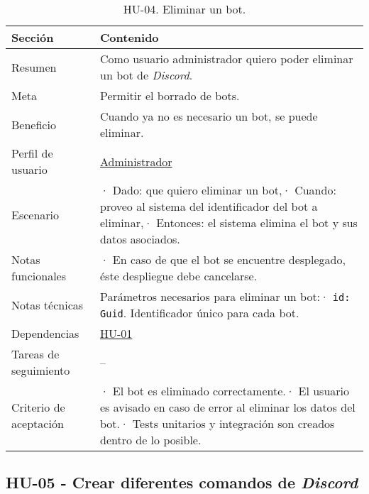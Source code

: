 \begin{table}[H]
    \centering
    \def\arraystretch{1.25}
    \begin{adjustbox}{max width=\textwidth}
    \begin{tabularx}{\textwidth}{|l|L|}
    \hline
        \textbf{Sección} & \textbf{Contenido} \\ \hline
    \hline
        Resumen & Como usuario administrador quiero poder eliminar un bot de \textit{Discord}. \\ \hline
        Meta & Permitir el borrado de bots. \\ \hline
        Beneficio & Cuando ya no es necesario un bot, se puede eliminar. \\ \hline
        Perfil de usuario & \hyperref[sec:personaAdmin]{Administrador} \\ \hline
        Escenario & · Dado: que quiero eliminar un bot,\linebreak · Cuando: proveo al sistema del identificador del bot a eliminar,\linebreak · Entonces: el sistema elimina el bot y sus datos asociados. \\ \hline
        Notas funcionales & ·  En caso de que el bot se encuentre desplegado, éste despliegue debe cancelarse. \\ \hline
        Notas técnicas & Parámetros necesarios para eliminar un bot:\linebreak · \verb|id: Guid|. Identificador único para cada bot. \\ \hline
        Dependencias & \hyperref[sec:hu01]{HU-01} \\ \hline
        Tareas de seguimiento & – \\ \hline
        Criterio de aceptación & · El bot es eliminado correctamente.\linebreak · El usuario es avisado en caso de error al eliminar los datos del bot.\linebreak · Tests unitarios y integración son creados dentro de lo posible. \\ \hline
    \end{tabularx}
    \end{adjustbox}
    \caption{HU-04. Eliminar un bot.}
\end{table}


\subsection{HU-05 - Crear diferentes comandos de \textit{Discord}}
\label{sec:hu05}

